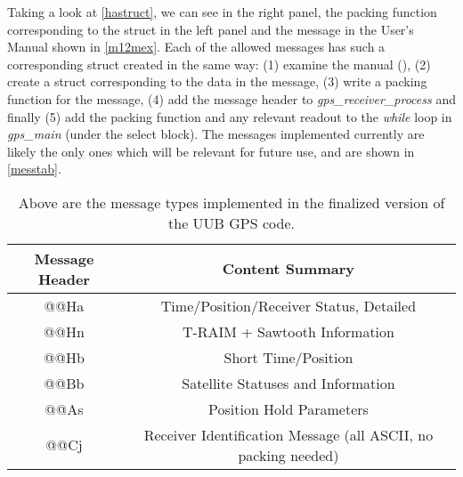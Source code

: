 Taking a look at \autoref{hastruct}, we can see in the right panel, the packing function corresponding to the struct in the left panel and the message in the User's Manual shown in \autoref{m12mex}. Each of the allowed messages has such a corresponding struct created in the same way: (1) examine the manual (\textcite{m12muser}), (2) create a struct corresponding to the data in the message, (3) write a packing function for the message, (4) add the message header to \textit{gps\_receiver\_process} and finally (5) add the packing function and any relevant readout to the \textit{while} loop in \textit{gps\_main} (under the select block). The messages implemented currently are likely the only ones which will be relevant for future use, and are shown in \autoref{messtab}.

\begin{table}[h!]
\centering
\begin{tabular}{|c|c|} \hline
Message Header & Content Summary  \\ \hline
@@Ha & Time/Position/Receiver Status, Detailed  \\ \hline
@@Hn & T-RAIM + Sawtooth Information  \\ \hline
@@Hb & Short Time/Position  \\ \hline
@@Bb & Satellite Statuses and Information   \\ \hline
@@As & Position Hold Parameters   \\ \hline
@@Cj & Receiver Identification Message (all ASCII, no packing needed)  \\ \hline
\end{tabular}
\caption[GPS Message Type]{Above are the message types implemented in the finalized version of the UUB GPS code.}
\label{messtab}
\end{table}




